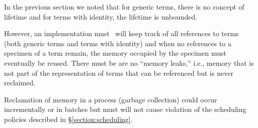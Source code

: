 \label{section:memory-management}

In the previous section we noted that for generic terms, there is no
concept of lifetime and for terms with identity, the lifetime is
unbounded.

However,
\ifStd an implementation must \fi
\ifOld \OldErlang\ will \fi
keep track of all references to terms
(both generic terms and terms with identity) and when no references to
a specimen of a term remain, the memory occupied by the specimen must
eventually be reused.  There
\ifStd must be \fi
\ifOld are \fi
no ``memory leaks,'' i.e., memory
that is not part of the representation of terms that can be referenced
but is never reclaimed.

Reclamation of memory in a process (garbage collection) could occur
incrementally or in batches but
\ifStd must \fi
\ifOld will \fi
not cause violation of the scheduling policies described in
\S\ref{section:scheduling}.
